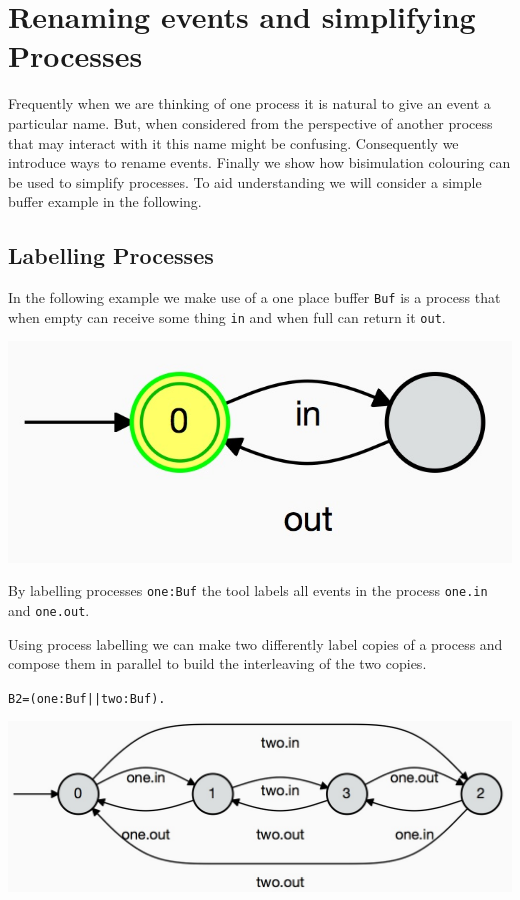 \documentclass[]{article}
\begin{document}
\section{ Renaming events and simplifying Processes}
Frequently when we are thinking of one process it is natural to give an event a particular name. But, when considered from the perspective of another process that may interact with it this name might be confusing. Consequently we introduce ways to rename events.
Finally we show how bisimulation colouring can be used to simplify processes. To aid understanding we will consider a simple buffer example in the following.
\subsection{Labelling Processes}
In the following example we make use of a one place buffer \verb$Buf$ is a process that when empty can receive some thing \verb$in$ and when full can return it \verb$out$.
\noindent\begin{center} \includegraphics[scale=0.15]{Buf.jpg} \end{center}
By labelling  processes  \verb$one:Buf$ the tool  labels all events in the process \verb$one.in$ and \verb$one.out$.

Using process labelling we can make two differently label copies of a process and compose them in parallel to build the interleaving of the two copies.


\noindent\begin{center}\verb$B2=(one:Buf||two:Buf).$\end{center}

\noindent\begin{center} \includegraphics[scale=0.15]{B2.jpg} \end{center}
\end{document}
